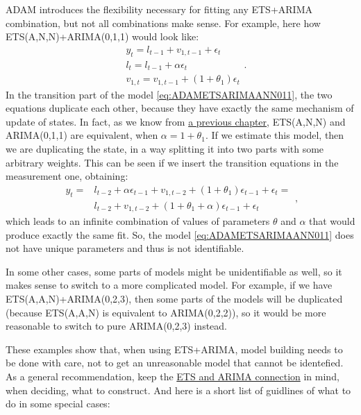 \documentclass[
]{book}
\theoremstyle{definition}
\theoremstyle{definition}
\theoremstyle{definition}
\theoremstyle{definition}
\theoremstyle{remark}
\begin{document}
ADAM introduces the flexibility necessary for fitting any ETS+ARIMA combination, but not all combinations make sense. For example, here how ETS(A,N,N)+ARIMA(0,1,1) would look like:
\begin{equation}
  \begin{aligned}
    &{y}_{t} = l_{t-1} + v_{1,t-1} + \epsilon_t \\
    &l_t = l_{t-1} + \alpha \epsilon_t \\
    &v_{1,t} = v_{1,t-1} + (1+\theta_1) \epsilon_t
  \end{aligned}.
  \label{eq:ADAMETSARIMAANN011}
\end{equation}
In the transition part of the model \eqref{eq:ADAMETSARIMAANN011}, the two equations duplicate each other, because they have exactly the same mechanism of update of states. In fact, as we know from \protect\hyperlink{ARIMAETS011}{a previous chapter}, ETS(A,N,N) and ARIMA(0,1,1) are equivalent, when \(\alpha=1+\theta_1\). If we estimate this model, then we are duplicating the state, in a way splitting it into two parts with some arbitrary weights. This can be seen if we insert the transition equations in the measurement one, obtaining:
\begin{equation}
  \begin{aligned}
    {y}_{t} = & l_{t-2} + \alpha \epsilon_{t-1} + v_{1,t-2} + (1+\theta_1) \epsilon_{t-1} + \epsilon_t =\\
    & l_{t-2} + v_{1,t-2} + (1+\theta_1+\alpha) \epsilon_{t-1} + \epsilon_t
  \end{aligned},
  \label{eq:ADAMETSARIMAANN011Measurement}
\end{equation}
which leads to an infinite combination of values of parameters \(\theta\) and \(\alpha\) that would produce exactly the same fit. So, the model \eqref{eq:ADAMETSARIMAANN011} does not have unique parameters and thus is not identifiable.

In some other cases, some parts of models might be unidentifiable as well, so it makes sense to switch to a more complicated model. For example, if we have ETS(A,A,N)+ARIMA(0,2,3), then some parts of the models will be duplicated (because ETS(A,A,N) is equivalent to ARIMA(0,2,2)), so it would be more reasonable to switch to pure ARIMA(0,2,3) instead.

These examples show that, when using ETS+ARIMA, model building needs to be done with care, not to get an unreasonable model that cannot be identefied. As a general recommendation, keep the \protect\hyperlink{ARIMAandETS}{ETS and ARIMA connection} in mind, when deciding, what to construct. And here is a short list of guidlines of what to do in some special cases:
\end{document}
